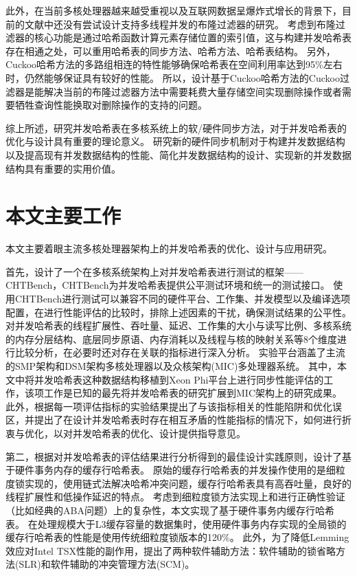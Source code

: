此外，在当前多核处理器越来越受重视以及互联网数据呈爆炸式增长的背景下，目前的文献中还没有尝试设计支持多线程并发的布隆过滤器的研究。
考虑到布隆过滤器的核心功能是通过哈希函数计算元素存储位置的索引值，这与构建并发哈希表存在相通之处，可以重用哈希表的同步方法、哈希方法、哈希表结构。
另外，Cuckoo哈希方法的多路组相连的特性能够确保哈希表在空间利用率达到95\%左右时，仍然能够保证具有较好的性能。
所以，设计基于Cuckoo哈希方法的Cuckoo过滤器是能解决当前的布隆过滤器方法中需要耗费大量存储空间实现删除操作或者需要牺牲查询性能换取对删除操作的支持的问题。

综上所述，研究并发哈希表在多核系统上的软/硬件同步方法，对于并发哈希表的优化与设计具有重要的理论意义。
研究新的硬件同步机制对于构建并发数据结构以及提高现有并发数据结构的性能、简化并发数据结构的设计、实现新的并发数据结构具有重要的实用价值。


\section{本文主要工作}
本文主要着眼主流多核处理器架构上的并发哈希表的优化、设计与应用研究。

首先，设计了一个在多核系统架构上对并发哈希表进行测试的框架——CHTBench，CHTBench为并发哈希表提供公平测试环境和统一的测试接口。
使用CHTBench进行测试可以兼容不同的硬件平台、工作集、并发模型以及编译选项配置，在进行性能评估的比较时，排除上述因素的干扰，确保测试结果的公平性。
对并发哈希表的线程扩展性、吞吐量、延迟、工作集的大小与读写比例、多核系统的内存分层结构、底层同步原语、内存消耗以及线程与核的映射关系等8个维度进行比较分析，在必要时还对存在关联的指标进行深入分析。
实验平台涵盖了主流的SMP架构和DSM架构多核处理器以及众核架构(MIC)多处理器系统。
其中，本文中将并发哈希表这种数据结构移植到Xeon Phi平台上进行同步性能评估的工作，该项工作是已知的最先将并发哈希表的研究扩展到MIC架构上的研究成果。
此外，根据每一项评估指标的实验结果提出了与该指标相关的性能陷阱和优化误区，并提出了在设计并发哈希表时存在相互矛盾的性能指标的情况下，如何进行折衷与优化，以对并发哈希表的优化、设计提供指导意见。

第二，根据对并发哈希表的评估结果进行分析得到的最佳设计实践原则，设计了基于硬件事务内存的缓存行哈希表。
原始的缓存行哈希表的并发操作使用的是细粒度锁实现的，使用链式法解决哈希冲突问题，缓存行哈希表具有高吞吐量，良好的线程扩展性和低操作延迟的特点。
考虑到细粒度锁方法实现上和进行正确性验证（比如经典的ABA问题）上的复杂性，本文实现了基于硬件事务内缓存行哈希表。
在处理规模大于L3缓存容量的数据集时，使用硬件事务内存实现的全局锁的缓存行哈希表的性能是使用传统细粒度锁版本的120\%。
此外，为了降低Lemming效应对Intel TSX性能的副作用，提出了两种软件辅助方法：软件辅助的锁省略方法(SLR)和软件辅助的冲突管理方法(SCM)。


